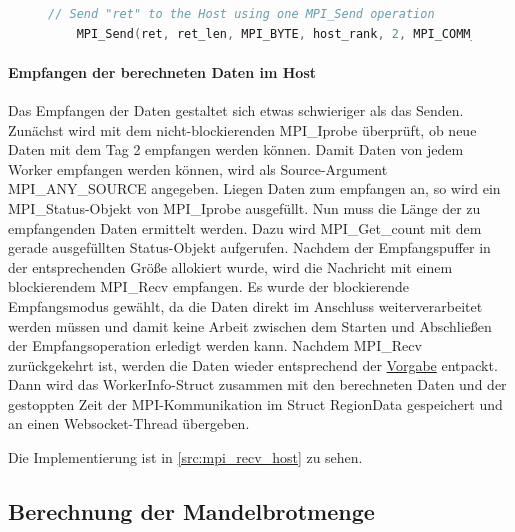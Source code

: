 \begin{figure}[h!]
	\begin{lstlisting}[language=c++, caption={Senden der berechneten Daten im Worker}, label={src:mpi_send_worker}, firstnumber=161]
	// Send "ret" to the Host using one MPI_Send operation
	MPI_Send(ret, ret_len, MPI_BYTE, host_rank, 2, MPI_COMM_WORLD);
	\end{lstlisting}
\end{figure}

\paragraph{Empfangen der berechneten Daten im Host}\label{para:recv_host}

Das Empfangen der Daten gestaltet sich etwas schwieriger als das Senden. Zunächst wird mit dem nicht-blockierenden MPI\_Iprobe überprüft, ob neue Daten mit dem Tag 2 empfangen werden können. Damit Daten von jedem Worker empfangen werden können, wird als Source-Argument MPI\_ANY\_SOURCE angegeben. Liegen Daten zum empfangen an, so wird ein MPI\_Status-Objekt von MPI\_Iprobe ausgefüllt. Nun muss die Länge der zu empfangenden Daten ermittelt werden. Dazu wird MPI\_Get\_count mit dem gerade ausgefüllten Status-Objekt aufgerufen. Nachdem der Empfangspuffer in der entsprechenden Größe allokiert wurde, wird die Nachricht mit einem blockierendem MPI\_Recv empfangen. Es wurde der blockierende Empfangsmodus gewählt, da die Daten direkt im Anschluss weiterverarbeitet werden müssen und damit keine Arbeit zwischen dem Starten und Abschließen der Empfangsoperation erledigt werden kann. Nachdem MPI\_Recv zurückgekehrt ist, werden die Daten wieder entsprechend der \hyperref[para:struktur_daten]{Vorgabe} entpackt. Dann wird das WorkerInfo-Struct zusammen mit den berechneten Daten und der gestoppten Zeit der MPI-Kommunikation im Struct RegionData gespeichert und an einen Websocket-Thread übergeben.

Die Implementierung ist in \autoref{src:mpi_recv_host} zu sehen.

\begin{figure}[h!]
	
\end{figure}

\subsection{Berechnung der Mandelbrotmenge}\label{sec:mandelbrot_calculation}

